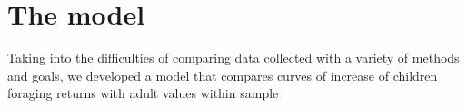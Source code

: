\section{The model}
Taking into the difficulties of comparing data collected with a variety of methods and goals, we developed a model that compares curves of increase of children foraging returns with adult values within sample
